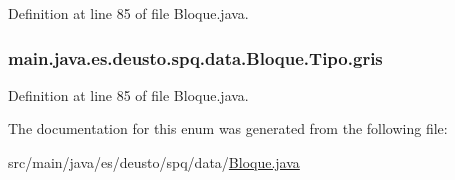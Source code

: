 Definition at line 85 of file Bloque.\+java.

\subsubsection[{\texorpdfstring{gris}{gris}}]{\setlength{\rightskip}{0pt plus 5cm}main.\+java.\+es.\+deusto.\+spq.\+data.\+Bloque.\+Tipo.\+gris}\hypertarget{enummain_1_1java_1_1es_1_1deusto_1_1spq_1_1data_1_1_bloque_1_1_tipo_aa00bb1fc4a841bd07186be450d92ffd5}{}\label{enummain_1_1java_1_1es_1_1deusto_1_1spq_1_1data_1_1_bloque_1_1_tipo_aa00bb1fc4a841bd07186be450d92ffd5}


Definition at line 85 of file Bloque.\+java.



The documentation for this enum was generated from the following file\+:\begin{DoxyCompactItemize}
\item 
src/main/java/es/deusto/spq/data/\hyperlink{_bloque_8java}{Bloque.\+java}\end{DoxyCompactItemize}
